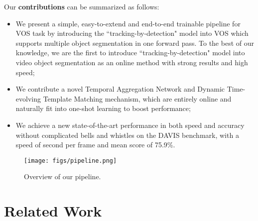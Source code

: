 \documentclass[10pt,twocolumn,letterpaper]{article}
\begin{document}
Our \textbf{contributions} can be summarized as follows:
\vspace{-3pt}
\begin{itemize}
   \item We present a simple, easy-to-extend and end-to-end trainable pipeline for VOS task by introducing the ``tracking-by-detection" model into VOS which supports multiple object segmentation in one forward pass. To the best of our knowledge, we are the first to introduce ``tracking-by-detection" model into video object segmentation as an online method with strong results and high speed;
\vspace{-3pt}
   \item We contribute a novel Temporal Aggregation Network and Dynamic Time-evolving Template Matching mechanism, which are entirely online and naturally fit into one-shot learning to boost performance;
\vspace{-3pt}
   \item We achieve a new state-of-the-art performance in both speed and accuracy without complicated bells and whistles on the DAVIS benchmark, with a speed of  second per frame and  mean score of 75.9\%.
\end{itemize}

\begin{figure*}
\begin{center}
   \texttt{[image: figs/pipeline.png]}
\end{center}
\vspace{-0.2in}
   \caption{Overview of our pipeline.}
\label{fig:pipeline}
\vspace{-0.2in}
\end{figure*}

\section{Related Work}
\end{document}
